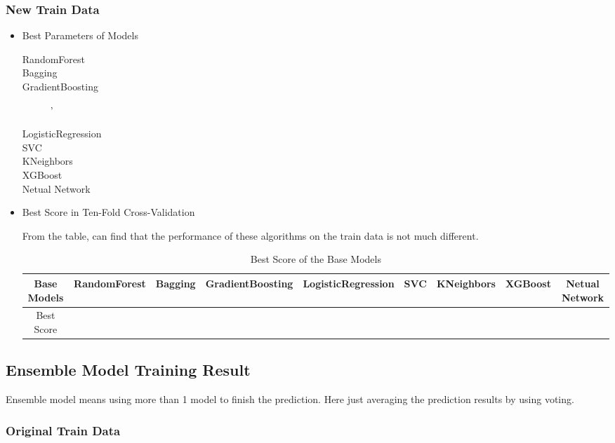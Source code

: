 \subsubsection{New Train Data}

\begin{itemize}
	\item Best Parameters of Models
	\begin{description}
		\item[RandomForest] 
		\item[Bagging] 
		\item[GradientBoosting] '
		\item[LogisticRegression] 
		\item[SVC] 
		\item[KNeighbors]  
		\item[XGBoost] 
		\item[Netual Network] 
	\end{description}
	
	\item Best Score in Ten-Fold Cross-Validation
	
	From the table, 
	can find that the performance of 
	these algorithms on the train data 
	is not much different.
	
	\begin{table}[h]  \centering
		\caption{Best Score of the Base Models}
		\label{tbl:best_score_base_models_new}
		\begin{tabular}{ccccccccc}
			\hline
			Base Models& RandomForest & Bagging & GradientBoosting & 
			LogisticRegression & SVC & KNeighbors & XGBoost & Netual Network\\
			\hline
			Best Score & \\
			\hline 
		\end{tabular}
	\end{table}
\end{itemize}


\subsection{Ensemble Model Training Result}

Ensemble model means using 
more than 1 model to finish the prediction.
Here just averaging the prediction results 
by using voting. 

\subsubsection{Original Train Data}


